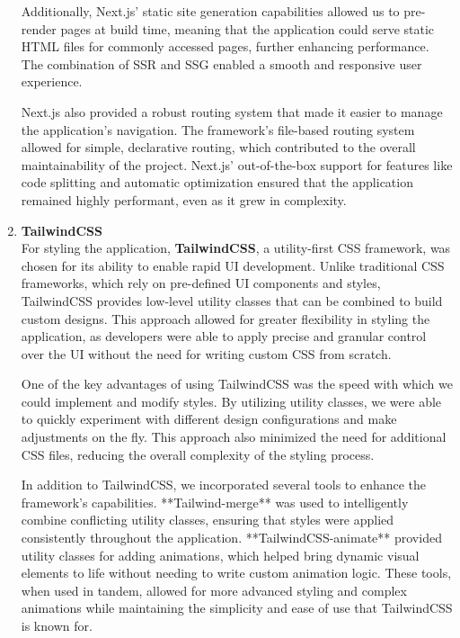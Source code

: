 \begin{enumerate}
    Additionally, Next.js’ static site generation capabilities allowed us to pre-render pages at build time, meaning that the application could serve static HTML files for commonly accessed pages, further enhancing performance. The combination of SSR and SSG enabled a smooth and responsive user experience.

    Next.js also provided a robust routing system that made it easier to manage the application’s navigation. The framework’s file-based routing system allowed for simple, declarative routing, which contributed to the overall maintainability of the project. Next.js’ out-of-the-box support for features like code splitting and automatic optimization ensured that the application remained highly performant, even as it grew in complexity. \\

    \item \textbf{TailwindCSS} \\
    For styling the application, \textbf{TailwindCSS}, a utility-first CSS framework, was chosen for its ability to enable rapid UI development. Unlike traditional CSS frameworks, which rely on pre-defined UI components and styles, TailwindCSS provides low-level utility classes that can be combined to build custom designs. This approach allowed for greater flexibility in styling the application, as developers were able to apply precise and granular control over the UI without the need for writing custom CSS from scratch.

    One of the key advantages of using TailwindCSS was the speed with which we could implement and modify styles. By utilizing utility classes, we were able to quickly experiment with different design configurations and make adjustments on the fly. This approach also minimized the need for additional CSS files, reducing the overall complexity of the styling process.

    In addition to TailwindCSS, we incorporated several tools to enhance the framework’s capabilities. **Tailwind-merge** was used to intelligently combine conflicting utility classes, ensuring that styles were applied consistently throughout the application. **TailwindCSS-animate** provided utility classes for adding animations, which helped bring dynamic visual elements to life without needing to write custom animation logic. These tools, when used in tandem, allowed for more advanced styling and complex animations while maintaining the simplicity and ease of use that TailwindCSS is known for.


\end{enumerate}
